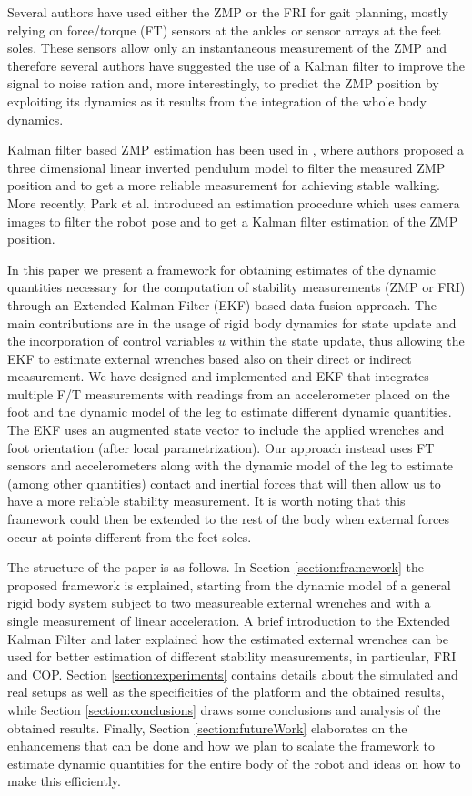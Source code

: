 \documentclass[letterpaper, 10 pt, conference]{ieeeconf}  %
\begin{document}
Several authors have used either the ZMP or the FRI for gait planning, mostly relying on force/torque (FT) sensors at the ankles or sensor arrays at the feet soles. These sensors allow only an instantaneous measurement of the ZMP and therefore several authors have suggested the use of a Kalman filter \cite{KalmanDeSchutter} to improve the signal to noise ration and, more interestingly, to predict the ZMP position by exploiting its dynamics as it results from the integration of the whole body dynamics. 

Kalman filter based ZMP estimation has been used in \cite{Park2007}, where authors proposed a three dimensional linear inverted pendulum model to filter the measured ZMP position and to get a more reliable measurement for achieving stable walking. More recently, Park et al. \cite{park2009balance} introduced an estimation procedure which uses camera images to filter the robot pose and to get a Kalman filter estimation of the ZMP position.

In this paper we present a framework for obtaining estimates of the dynamic quantities necessary for the computation of stability measurements (ZMP or FRI) through an Extended Kalman Filter (EKF) based data fusion approach. The main contributions are in the usage of rigid body dynamics for state update and the incorporation of control variables $u$ within the state update, thus allowing the EKF to estimate external wrenches based also on their direct or indirect measurement. We have designed and implemented and EKF that integrates multiple F/T measurements with readings from an accelerometer placed on the foot and the dynamic model of the leg to estimate different dynamic quantities. The EKF uses an augmented state vector to include the applied wrenches and foot orientation (after local parametrization). Our approach instead uses FT sensors and accelerometers along with the dynamic model of the leg to estimate (among other quantities) contact and inertial forces that will then allow us to have a more reliable stability measurement. It is worth noting that this framework could then be extended to the rest of the body when external forces occur at points different from the feet soles. 

The structure of the paper is as follows. In Section \ref{section:framework} the proposed framework is explained, starting from the dynamic model of a general rigid body system subject to two measureable external wrenches and with a single measurement of linear acceleration. A brief introduction to the Extended Kalman Filter and later explained how the estimated external wrenches can be used for better estimation of different stability measurements, in particular, FRI and COP. Section \ref{section:experiments} contains details about the simulated and real setups as well as the specificities of the platform and the obtained results, while Section \ref{section:conclusions} draws some conclusions and analysis of the obtained results. Finally, Section \ref{section:futureWork} elaborates on the enhancemens that can be done and how we plan to scalate the framework to estimate dynamic quantities for the entire body of the robot and ideas on how to make this efficiently.
\end{document}
